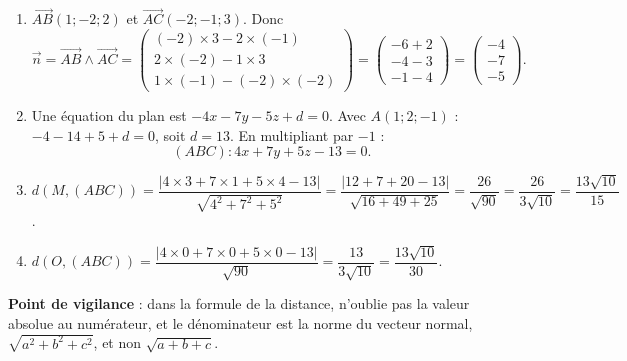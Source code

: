 \documentclass[11pt]{article}
\begin{document}
\begin{corrige}
\begin{enumerate}
\item $\overrightarrow{AB}(1 ; -2 ; 2)$ et $\overrightarrow{AC}(-2 ; -1 ; 3)$. Donc
\[ \vec{n} = \overrightarrow{AB} \wedge \overrightarrow{AC} = \begin{pmatrix} (-2)\times 3 - 2\times(-1) \\ 2\times(-2) - 1\times 3 \\ 1\times(-1) - (-2)\times(-2) \end{pmatrix} = \begin{pmatrix} -6+2 \\ -4-3 \\ -1-4 \end{pmatrix} = \begin{pmatrix} -4 \\ -7 \\ -5 \end{pmatrix}. \]
\item Une équation du plan est $-4x - 7y - 5z + d = 0$. Avec $A(1 ; 2 ; -1)$ : $-4 - 14 + 5 + d = 0$, soit $d = 13$. En multipliant par $-1$ :
\[ (ABC) : 4x + 7y + 5z - 13 = 0. \]
\item $d(M, (ABC)) = \dfrac{|4\times 3 + 7\times 1 + 5\times 4 - 13|}{\sqrt{4^2 + 7^2 + 5^2}} = \dfrac{|12 + 7 + 20 - 13|}{\sqrt{16 + 49 + 25}} = \dfrac{26}{\sqrt{90}} = \dfrac{26}{3\sqrt{10}} = \dfrac{13\sqrt{10}}{15}$.
\item $d(O, (ABC)) = \dfrac{|4\times 0 + 7\times 0 + 5\times 0 - 13|}{\sqrt{90}} = \dfrac{13}{3\sqrt{10}} = \dfrac{13\sqrt{10}}{30}$.
\end{enumerate}
\textbf{Point de vigilance} : dans la formule de la distance, n'oublie pas la valeur absolue au numérateur, et le dénominateur est la norme du vecteur normal, $\sqrt{a^2+b^2+c^2}$, et non $\sqrt{a+b+c}$.
\end{corrige}
\end{document}
